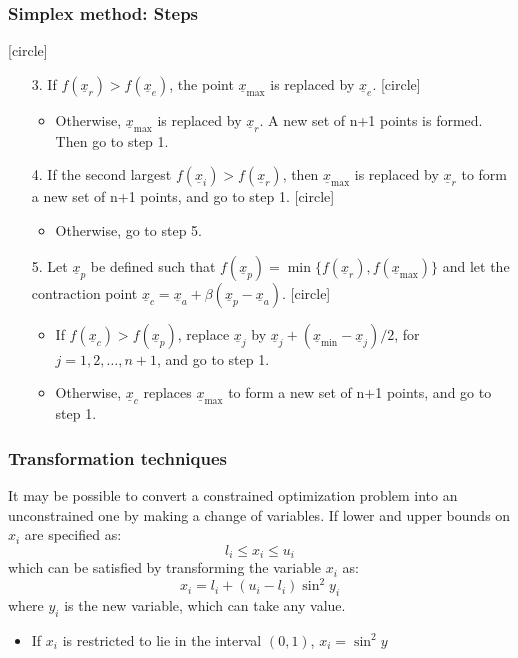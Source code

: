 \documentclass{beamer}
\begin{document}
\begin{frame}
    \frametitle{Simplex method: Steps}
    [circle]
    \begin{enumerate}
        \item[3.]If $f(\underline{x}_r)>f(\underline{x}_e)$, the point $\underline{x}_{\max}$ is \alert{replaced} by $\underline{x}_e$.
        [circle]
        \begin{itemize}
            \item Otherwise, $\underline{x}_{\max}$ is \alert{replaced} by $\underline{x}_r$.
            A new set of n+1 points is formed. Then go to step 1.
        \end{itemize}
        \item[4.]If the second largest $f(\underline{x}_i)>f(\underline{x}_{r})$,
         then $\underline{x}_{\max}$ is \alert{replaced} by $\underline{x}_r$ to form a new set of n+1 points,
         and go to step 1.
         [circle]
         \begin{itemize}
             \item Otherwise, go to step 5.
         \end{itemize}
        \item[5.] Let $\underline{x}_p$ be defined such that $f(\underline{x}_p)=\min{\{f(\underline{x}_r), f(\underline{x}_{\max})\}}$
        and let the contraction point $\underline{x}_c=\underline{x}_a+\beta (\underline{x}_p-\underline{x}_a)$.
        [circle]
        \begin{itemize}
            \item If $f(\underline{x}_c)>f(\underline{x}_p)$, \alert{replace} $\underline{x}_j$ by $\underline{x}_j+(\underline{x}_{\min}-\underline{x}_j)/2$, for $j=1,2,\dots,n+1$, and go to step 1.
            \item Otherwise, $\underline{x}_c$ \alert{replaces} $\underline{x}_{\max}$ to form a new set of n+1 points, and go to step 1.
        \end{itemize}
    \end{enumerate}
\end{frame}

\begin{frame}
    \frametitle{Transformation techniques}
    It may be possible to convert a constrained optimization problem into an unconstrained one
    by making a change of variables.
    \hfill \break
    If lower and upper bounds on $x_i$ are specified as:
    $$l_i\leq x_i\leq u_i$$
    which can be satisfied by transforming the variable $x_i$ as:
    $$x_i=l_i+(u_i-l_i)\sin^2y_i$$
    where $y_i$ is the new variable, which can take any value.
    \begin{itemize}
    \item If $x_i$ is restricted to lie in the interval $(0, 1)$, $x_i=\sin^2y$
    \end{itemize}
    
\end{frame}
\end{document}
